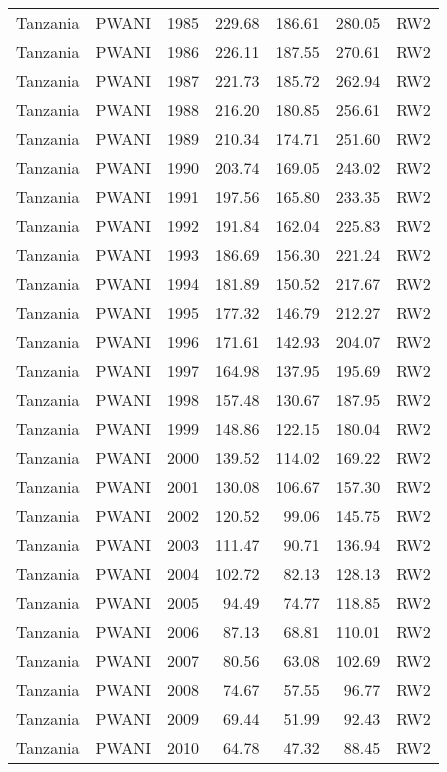 \begin{longtable}{lllrrrl}
  Tanzania & PWANI & 1985 & 229.68 & 186.61 & 280.05 & RW2 \\ 
  Tanzania & PWANI & 1986 & 226.11 & 187.55 & 270.61 & RW2 \\ 
  Tanzania & PWANI & 1987 & 221.73 & 185.72 & 262.94 & RW2 \\ 
  Tanzania & PWANI & 1988 & 216.20 & 180.85 & 256.61 & RW2 \\ 
  Tanzania & PWANI & 1989 & 210.34 & 174.71 & 251.60 & RW2 \\ 
  Tanzania & PWANI & 1990 & 203.74 & 169.05 & 243.02 & RW2 \\ 
  Tanzania & PWANI & 1991 & 197.56 & 165.80 & 233.35 & RW2 \\ 
  Tanzania & PWANI & 1992 & 191.84 & 162.04 & 225.83 & RW2 \\ 
  Tanzania & PWANI & 1993 & 186.69 & 156.30 & 221.24 & RW2 \\ 
  Tanzania & PWANI & 1994 & 181.89 & 150.52 & 217.67 & RW2 \\ 
  Tanzania & PWANI & 1995 & 177.32 & 146.79 & 212.27 & RW2 \\ 
  Tanzania & PWANI & 1996 & 171.61 & 142.93 & 204.07 & RW2 \\ 
  Tanzania & PWANI & 1997 & 164.98 & 137.95 & 195.69 & RW2 \\ 
  Tanzania & PWANI & 1998 & 157.48 & 130.67 & 187.95 & RW2 \\ 
  Tanzania & PWANI & 1999 & 148.86 & 122.15 & 180.04 & RW2 \\ 
  Tanzania & PWANI & 2000 & 139.52 & 114.02 & 169.22 & RW2 \\ 
  Tanzania & PWANI & 2001 & 130.08 & 106.67 & 157.30 & RW2 \\ 
  Tanzania & PWANI & 2002 & 120.52 & 99.06 & 145.75 & RW2 \\ 
  Tanzania & PWANI & 2003 & 111.47 & 90.71 & 136.94 & RW2 \\ 
  Tanzania & PWANI & 2004 & 102.72 & 82.13 & 128.13 & RW2 \\ 
  Tanzania & PWANI & 2005 & 94.49 & 74.77 & 118.85 & RW2 \\ 
  Tanzania & PWANI & 2006 & 87.13 & 68.81 & 110.01 & RW2 \\ 
  Tanzania & PWANI & 2007 & 80.56 & 63.08 & 102.69 & RW2 \\ 
  Tanzania & PWANI & 2008 & 74.67 & 57.55 & 96.77 & RW2 \\ 
  Tanzania & PWANI & 2009 & 69.44 & 51.99 & 92.43 & RW2 \\ 
  Tanzania & PWANI & 2010 & 64.78 & 47.32 & 88.45 & RW2 \\ 

\end{longtable}

